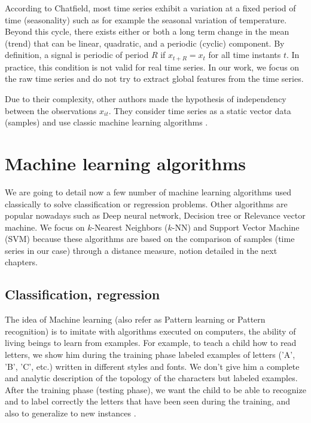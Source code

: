 \noindent According to Chatfield, most time series exhibit a variation at a fixed period of time (seasonality) such as for example the seasonal variation of temperature. Beyond this cycle, there exists either or both a long term change in the mean (trend) that can be linear, quadratic, and a periodic (cyclic) component. By definition, a signal is periodic of period $R$ if $x_{t+R}=x_t$ for all time instants $t$. In practice, this condition is not valid for real time series. In our work, we focus on the raw time series and do not try to extract global features from the time series.

Due to their complexity, other authors made the hypothesis of independency between the observations $x_{it}$. They consider time series as a static vector data (samples) and use classic machine learning algorithms .




\section{Machine learning algorithms}

We are going to detail now a few number of machine learning algorithms used classically to solve classification or regression problems. Other algorithms are popular nowadays such as Deep neural network, Decision tree or Relevance vector machine. We focus on $k$-Nearest Neighbors ($k$-NN) and Support Vector Machine (SVM) because these algorithms are based on the comparison of samples (time series in our case) through a distance measure, notion detailed in the next chapters.

\subsection{Classification, regression}
The idea of Machine learning (also refer as Pattern learning or Pattern recognition) is to imitate with algorithms executed on computers, the ability of living beings to learn from examples. For example, to teach a child how to read letters, we show him during the training phase labeled examples of letters ('A', 'B', 'C', etc.) written in different styles and fonts. We don't give him a complete and analytic description of the topology of the characters but labeled examples. After the training phase (testing phase), we want the child to be able to recognize and to label correctly the letters that have been seen during the training, and also to generalize to new instances \cite{Dreyfus2006}. 


